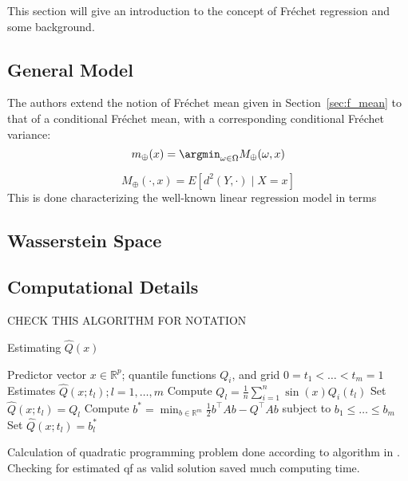 This section will give an introduction to the concept of Fréchet regression
and some background.

\subsection{General Model}
\label{sec:general}
The authors extend the notion of Fréchet mean given in Section~\ref{sec:f_mean} to that
of a conditional Fréchet mean, with a corresponding conditional Fréchet variance:
\begin{equation}
    m_\oplus(x) = \argmin_{\omega \in \Omega} M_\oplus(\omega, x)
\end{equation}

\begin{equation}
    M_\oplus(\cdot, x) = E \left[ d^2(Y, \cdot) \mid X = x \right]
\end{equation}
This is done characterizing the well-known linear regression model in terms 

\subsection{Wasserstein Space}
\label{sec:wasserstein_space}

\subsection{Computational Details}
\label{sec:computation}

CHECK THIS ALGORITHM FOR NOTATION
\begin{algorithm}
    \caption{Estimating \(\hat{Q}(x)\)}
    \label{alg:quadprog}
    \begin{algorithmic}[1]
    \Require Predictor vector \( x \in \mathbb{R}^p \); quantile functions \( Q_i \), and grid \( 0 = t_1 < \ldots < t_m = 1 \)
    \Ensure Estimates \( \hat{Q}(x; t_l); l = 1, \ldots, m \)
        \State Compute \( Q_l = \frac{1}{n} \sum_{i=1}^{n} \sin(x) Q_i(t_l) \)
    \EndFor
        \State Set \( \hat{Q}(x; t_l) = Q_l \)
    \Else
        \State Compute \( b^* = \min_{b \in \mathbb{R}^m} \frac{1}{2} b^\top A b - Q^\top A b \) subject to \( b_1 \leq \ldots \leq b_m \)
        \State Set \( \hat{Q}(x; t_l) = b^*_l \)
    \EndIf
    \end{algorithmic}
\end{algorithm}


Calculation of quadratic programming problem done according to algorithm in \textcite{PetersenLiuDivani2021}.
Checking for estimated qf as valid solution saved much computing time.